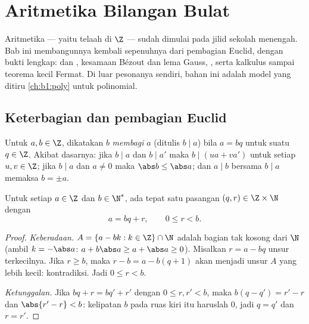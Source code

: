 \chapter{Aritmetika Bilangan Bulat}\label{ch:b1:arith}

Aritmetika --- yaitu telaah  di $\Z$ --- sudah dimulai pada
jilid sekolah menengah. Bab ini membangunnya kembali sepenuhnya dari
pembagian Euclid, dengan bukti lengkap:  dan
, kesamaan Bézout dan lema Gauss, ,
serta kalkulus  sampai teorema kecil Fermat. Di luar
pesonanya sendiri, bahan ini adalah model yang ditiru
\cref{ch:b1:poly} untuk polinomial.

\section{Keterbagian dan pembagian Euclid}

\begin{definition}[Keterbagian]\label{def:b1:arith:divides}
Untuk $a, b \in \Z$, dikatakan $b$ \emph{membagi} $a$ (ditulis $b \mid
a$) bila $a = bq$ untuk suatu $q \in \Z$. Akibat
dasarnya: jika $b \mid a$ dan $b \mid a'$ maka $b \mid (ua + va')$
untuk setiap $u, v \in \Z$; jika $b \mid a$ dan $a \neq 0$ maka $\abs b \leq
\abs a$; dan $a \mid b$ bersama $b \mid a$ memaksa $b = \pm a$.
\end{definition}

\begin{theorem}\label{thm:b1:arith:division}
Untuk setiap $a \in \Z$ dan $b \in \N^*$, ada tepat satu pasangan $(q, r)
\in \Z \times \N$ dengan
\[
a = bq + r, \qquad 0 \leq r < b .
\]
\end{theorem}

\begin{proof}
\emph{Keberadaan.}  $A = \{a - bk : k \in \Z\} \cap \N$ adalah
 bagian tak kosong dari $\N$ (ambil $k = -\abs a$: $a + b\abs a \geq a +
\abs a \geq 0$). Misalkan $r = a - bq$ unsur terkecilnya. Jika $r \geq b$,
maka $r - b = a - b(q+1)$ akan menjadi unsur $A$ yang lebih kecil:
kontradiksi. Jadi $0 \leq r < b$.

\emph{Ketunggalan.} Jika $bq + r = bq' + r'$ dengan $0 \leq r, r' < b$,
maka $b(q - q') = r' - r$ dan $\abs{r' - r} < b$: kelipatan $b$
pada ruas kiri itu haruslah $0$, jadi $q = q'$ dan $r = r'$.
\end{proof}

